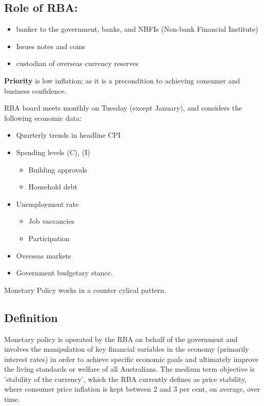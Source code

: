 \documentclass[11pt]{article}
\begin{document}
\subsection{Role of RBA:}
\label{sec-3-1}

\begin{itemize}
\item banker to the government, banks, and NBFIs (Non-bank Financial
Institute)
\item Issues notes and coins
\item custodian of overseas currency reserves
\end{itemize}

\textbf{Priority} is low inflation; as it is a precondition to achieving
 consumer and business confidence.

RBA board meets monthly on Tuesday (except January), and considers the
following economic data:

\begin{itemize}
\item Quarterly trends in headline CPI
\item Spending levels (C), (I)
\begin{itemize}
\item Building approvals
\item Household debt
\end{itemize}
\item Unemployment rate
\begin{itemize}
\item Job vaccancies
\item Participation
\end{itemize}
\item Overseas markets
\item Government budgetary stance.
\end{itemize}

Monetary Policy works in a counter cylical pattern.

\subsection{Definition}
\label{sec-3-2}

Monetary policy is operated by the RBA on behalf of the government and
involves the manipulation of key financial variables in the economy
(primarily interest rates) in order to achieve specific economic goals
and ultimately improve the living standards or welfare of all
Australians. The medium term objective is 'stability of the
currency', which the RBA currently defines as price stability, where
consumer price inflation is kept between 2 and 3 per cent, on average,
over time.
\end{document}
